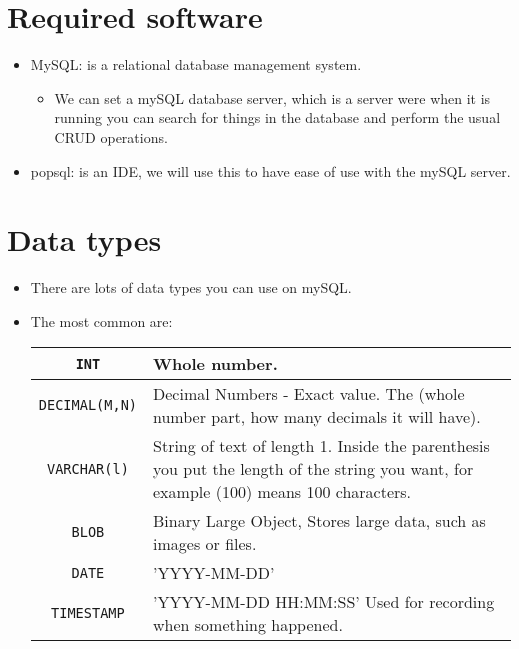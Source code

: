 \section{Required software}
\begin{itemize}
    \item MySQL: is a relational database management system.
        \begin{itemize}
            \item We can set a mySQL database server, which is a server were when it is running you can search for things in the database and perform the usual CRUD operations.
        \end{itemize}

    \item popsql: is an IDE, we will use this to have ease of use with the mySQL server.
\end{itemize}

\section{Data types}
\begin{itemize}
    \item There are lots of data types you can use on mySQL.
    \item The most common are:
        \begin{center}
            \begin{tabular}{ |c|p{12cm}| }
                \hline
                    \texttt{INT} & Whole number. \\
                \hline
                    \texttt{DECIMAL(M,N)} & Decimal Numbers - Exact value. The (whole number part, how many decimals it will have). \\
                \hline
                    \texttt{VARCHAR(l)} & String of text of length 1. Inside the parenthesis you put the length of the string you want, for example (100) means 100 characters. \\
                \hline
                    \texttt{BLOB} & Binary Large Object, Stores large data, such as images or files. \\
                \hline
                    \texttt{DATE} & 'YYYY-MM-DD' \\
                \hline
                    \texttt{TIMESTAMP} & 'YYYY-MM-DD HH:MM:SS' Used for recording when something happened. \\
                \hline
            \end{tabular}
        \end{center}
\end{itemize}

